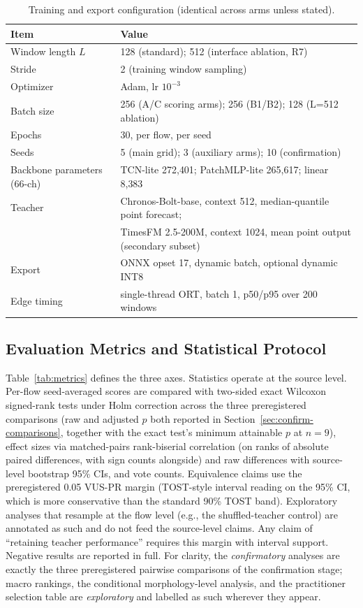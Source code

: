 \begin{table}[t]
\centering
\caption{Training and export configuration (identical across arms unless
stated).}
\label{tab:hyper}
\scriptsize
\begin{tabular}{p{3.4cm}p{8.5cm}}
\toprule
Item & Value \\
\midrule
Window length $L$ & 128 (standard); 512 (interface ablation, R7) \\
Stride & 2 (training window sampling) \\
Optimizer & Adam, lr $10^{-3}$ \\
Batch size & 256 (A/C scoring arms); 256 (B1/B2); 128 (L=512 ablation) \\
Epochs & 30, per flow, per seed \\
Seeds & 5 (main grid); 3 (auxiliary arms); 10 (confirmation) \\
Backbone parameters (66-ch) & TCN-lite 272{,}401; PatchMLP-lite 265{,}617; linear 8{,}383 \\
Teacher & Chronos-Bolt-base, context 512, median-quantile point forecast; \\
 & TimesFM 2.5-200M, context 1024, mean point output (secondary subset) \\
Export & ONNX opset 17, dynamic batch, optional dynamic INT8 \\
Edge timing & single-thread ORT, batch 1, p50/p95 over 200 windows \\
\bottomrule
\end{tabular}
\end{table}

\subsection{Evaluation Metrics and Statistical Protocol}\label{sec:setup-metrics}
Table~\ref{tab:metrics} defines the three axes. Statistics operate at the
source level. Per-flow seed-averaged scores are compared with two-sided
exact Wilcoxon signed-rank tests under Holm correction across the
three preregistered comparisons (raw and adjusted $p$ both reported in
Section~\ref{sec:confirm-comparisons}, together with the exact test's
minimum attainable $p$ at $n{=}9$), effect sizes via
matched-pairs rank-biserial correlation (on ranks of absolute paired
differences, with sign counts alongside) and raw differences with
source-level bootstrap 95\% CIs, and vote counts. Equivalence claims use
the preregistered 0.05 VUS-PR margin (TOST-style interval reading on
the 95\% CI, which is more conservative than the standard 90\% TOST
band). Exploratory analyses that resample at the flow level (e.g., the
shuffled-teacher control) are annotated as such and do not feed the
source-level claims.
Any claim of ``retaining teacher performance'' requires this margin with
interval support. Negative results are reported in full. For clarity,
the \emph{confirmatory} analyses are exactly the three preregistered
pairwise comparisons of the confirmation stage; macro rankings, the
conditional morphology-level analysis, and the practitioner selection
table are \emph{exploratory} and labelled as such wherever they appear.



